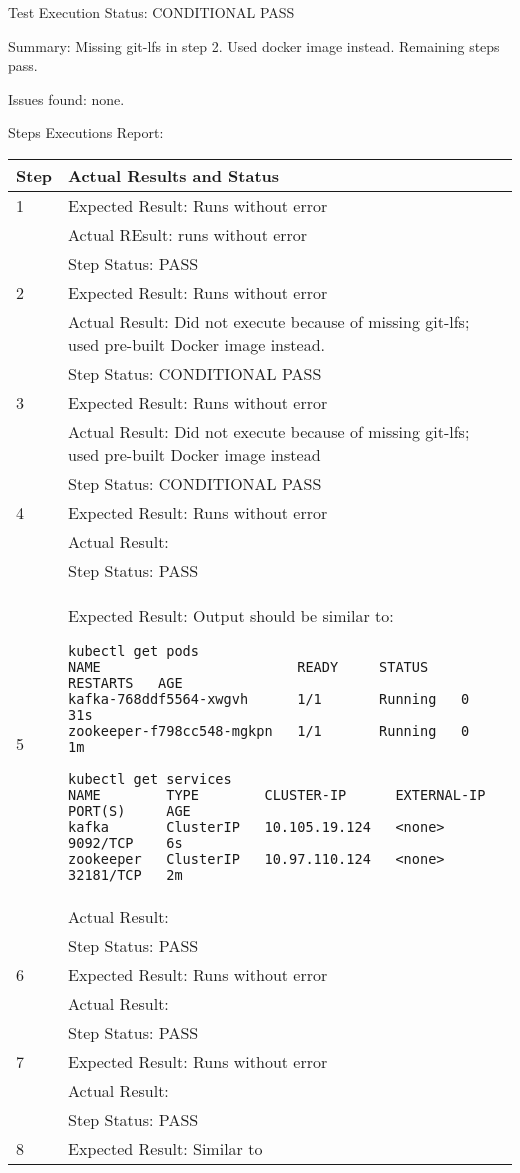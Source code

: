 \documentclass[DM,lsstdraft,STR,toc]{lsstdoc}
\begin{document}
Test Execution Status: CONDITIONAL PASS

Summary: Missing git-lfs in step 2. Used docker image instead. Remaining steps pass.

Issues found: none.

Steps Executions Report:

\begin{longtable}{p{2cm}p{14cm}}
\hline
{Step} & {Actual Results and Status}\\ \hline
1 & Expected Result: Runs without error \\\cline{2-2}
  & Actual REsult: runs without error \\\cline{2-2}
  & Step Status: PASS \\\hline
2 & Expected Result: Runs without error \\\cline{2-2}
  & Actual Result: Did not execute because of missing git-lfs; used pre-built Docker image instead. \\\cline{2-2}
  & Step Status: CONDITIONAL PASS \\\hline
3 & Expected Result: Runs without error \\\cline{2-2}
  & Actual Result: Did not execute because of missing git-lfs; used pre-built Docker image instead \\\cline{2-2}
  & Step Status: CONDITIONAL PASS \\\hline
4 & Expected Result: Runs without error \\\cline{2-2}
  & Actual Result: \\\cline{2-2}
  & Step Status: PASS \\\hline
5 & Expected Result: Output should be similar to:

\scriptsize{
\begin{verbatim}
kubectl get pods
NAME                        READY     STATUS    RESTARTS   AGE
kafka-768ddf5564-xwgvh      1/1       Running   0          31s
zookeeper-f798cc548-mgkpn   1/1       Running   0          1m

kubectl get services
NAME        TYPE        CLUSTER-IP      EXTERNAL-IP   PORT(S)     AGE
kafka       ClusterIP   10.105.19.124   <none>        9092/TCP    6s
zookeeper   ClusterIP   10.97.110.124   <none>        32181/TCP   2m
\end{verbatim}
}
\\\cline{2-2}
  & Actual Result: \\\cline{2-2}
  & Step Status: PASS \\\hline
6 & Expected Result: Runs without error \\\cline{2-2}
  & Actual Result: \\\cline{2-2}
  & Step Status: PASS \\\hline
7 & Expected Result: Runs without error \\\cline{2-2}
  & Actual Result: \\\cline{2-2}
  & Step Status: PASS \\\hline
8 & Expected Result: Similar to


\end{longtable}
\end{document}
